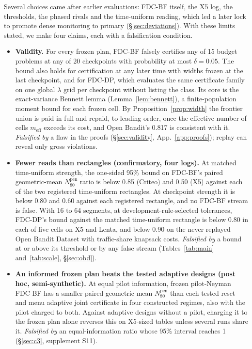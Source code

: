 \documentclass[sigconf,anonymous,review]{acmart}
\newcommand{\Npen}{N_{80}^{\text{pen}}}
\newcommand{\meff}{m_{\text{eff}}}
\begin{document}
Several choices came after earlier evaluations: FDC-BF itself, the X5 log, the thresholds, the phased rivals and the time-uniform reading, which led a later lock to promote dense monitoring to primary (\S\ref{sec:deviations}). With these limits stated, we make four claims, each with a falsification condition.

\begin{itemize}
\item[\textbf{C1}] \textbf{Validity.} For every frozen plan, FDC-BF falsely certifies any of 15 budget problems at any of 20 checkpoints with probability at most $\delta = 0.05$. The bound also holds for certification at any later time with widths frozen at the last checkpoint, and for FDC-DP, which evaluates the same certificate family on one global $\lambda$ grid per checkpoint without listing the class. Its core is the exact-variance Bennett lemma (Lemma~\ref{lem:bennett}), a finite-population moment bound for each frozen cell. By Proposition~\ref{prop:width} the frontier union is paid in full and repaid, to leading order, once the effective number of cells $\meff$ exceeds its cost, and Open Bandit's 0.817 is consistent with it. \emph{Falsified by} a flaw in the proofs (\S\ref{sec:validity}, App.~\ref{app:proofs}); replay can reveal only gross violations.
\item[\textbf{C2}] \textbf{Fewer reads than rectangles (confirmatory, four logs).} At matched time-uniform strength, the one-sided 95\% bound on FDC-BF's paired geometric-mean $\Npen$ ratio is below 0.85 (Criteo) and 0.50 (X5) against each of the two registered time-uniform rectangles. At checkpoint strength it is below 0.80 and 0.60 against each registered rectangle, and no FDC-BF stream is false. With 16 to 64 segments, at development-rule-selected tolerances, FDC-DP's bound against the matched time-uniform rectangle is below 0.80 in each of five cells on X5 and Lenta, and below 0.90 on the never-replayed Open Bandit Dataset with traffic-share knapsack costs. \emph{Falsified by} a bound at or above its threshold or by any false stream (Tables~\ref{tab:main} and~\ref{tab:scale}, \S\ref{sec:obd}).
\item[\textbf{C3}] \textbf{An informed frozen plan beats the tested adaptive designs (post hoc, semi-synthetic).} At equal pilot information, frozen pilot-Neyman FDC-BF has a smaller paired geometric-mean $\Npen$ than each tested reset and menu adaptive joint certificate in four constructed regimes, also with the pilot charged to both. Against adaptive designs without a pilot, charging it to the frozen plan alone reverses this on X5-sized tables unless several runs share it. \emph{Falsified by} an equal-information ratio whose 95\% interval reaches 1 (\S\ref{sec:c3}, supplement S11).

\end{itemize}
\end{document}
